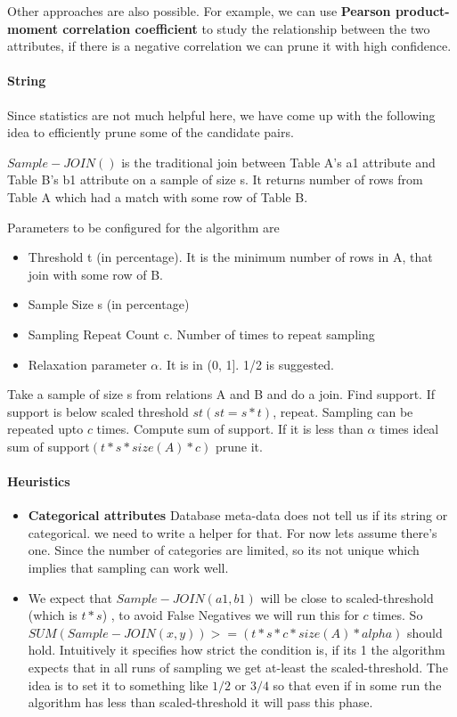 \documentclass{article}
\begin{document}
   Other approaches are also possible. For example, we can use \textbf{Pearson product-moment correlation coefficient} to study the relationship between the two attributes, if there is a negative correlation we can prune it with high confidence.

   
\paragraph{String}

Since statistics are not much helpful here, we have come up with the following idea to efficiently prune some of the candidate pairs.

$Sample-JOIN()$ is the traditional join between Table A's a1 attribute and Table B's b1 attribute on a sample of size s.  It returns number of rows from Table A which had a match with some row of Table B.

Parameters to be configured for the algorithm are
\begin{itemize}
\item Threshold t (in percentage). It is the minimum number of rows in A, that join with some row of B.
\item Sample Size s (in percentage)
\item Sampling Repeat Count c. Number of times to repeat sampling
\item Relaxation parameter $\alpha$. It is in (0, 1]. 1/2 is suggested.
\end{itemize}

Take a sample of size s from relations A and B and do a join. Find support. If support is below scaled threshold $st( st = s * t)$, repeat. Sampling can be repeated upto $c$ times.
Compute sum of support. If it is less than $\alpha$ times ideal sum of support$(t * s * size(A) * c)$ prune it.

\paragraph{Heuristics}
\begin{itemize}


\item \textbf{Categorical attributes} Database meta-data does not tell us if its string or categorical. we need to write a helper for that. For now lets assume there's one. 	         Since the number of categories are limited, so its not unique which implies that sampling can work well.

\item We expect that $Sample-JOIN(a1,b1)$ will be close to scaled-threshold (which is $t * s$) , to avoid False Negatives we will run this for $c$ times. So $SUM(Sample-JOIN(x,y)) >= (t * s * c * size(A) * alpha)$ should hold. Intuitively it specifies how strict the condition is, if its 1 the algorithm expects that in all runs of sampling we get at-least the scaled-threshold.  The idea is to set it to something like $1/2$ or $3/4$ so that even if in some run the algorithm has less than scaled-threshold it will pass this phase.
\end{itemize}
\end{document}
